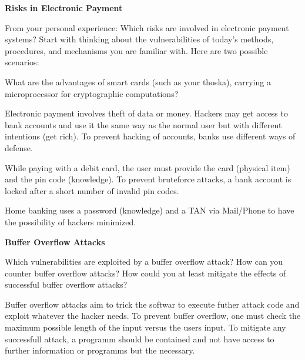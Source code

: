 \documentclass[10pt]{exam}  %
\begin{document}
\begin{questions}
    \question \textbf{Risks in Electronic Payment}\hfill

    From your personal experience: Which risks are involved in electronic payment systems?
    Start with thinking about the vulnerabilities of today’s methods, procedures, and mechanisms you are familiar with. Here are two possible scenarios:
    What are the advantages of smart cards (such as your thoska), carrying a microprocessor for cryptographic computations?
    \begin{solution}
        Electronic payment involves theft of data or money. Hackers may get access to bank accounts and use it the same way as the normal user but with different intentions (get rich). To prevent hacking of accounts, banks use different ways of defense.

        While paying with a debit card, the user must provide the card (physical item) and the pin code (knowledge). To prevent bruteforce attacks, a bank account is locked after a short number of invalid pin codes.

        Home banking uses a password (knowledge) and a TAN via Mail/Phone to have the possibility of hackers minimized.
    \end{solution}

    \question \textbf{Buffer Overflow Attacks}\hfill

    Which vulnerabilities are exploited by a buffer overflow attack? How can you counter buffer overflow attacks? How could you at least mitigate the effects of successful buffer overflow attacks?
    \begin{solution}
        Buffer overflow attacks aim to trick the softwar to execute futher attack code and exploit whatever the hacker needs. To prevent buffer overflow, one must check the maximum possible length of the input versus the users input. To mitigate any successfull attack, a programm should be contained and not have access to further information or programms but the necessary.


\end{solution}
\end{questions}
\end{document}
